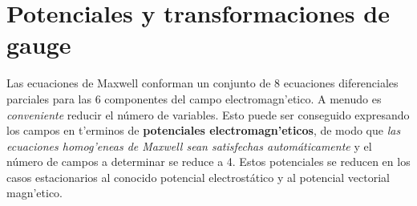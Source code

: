 \section{Potenciales y transformaciones de gauge}

Las ecuaciones de Maxwell conforman un conjunto de 8 ecuaciones diferenciales
parciales para las 6 componentes del campo electromagn'etico. A menudo es
\textit{conveniente} reducir el número de variables. Esto puede ser conseguido
expresando los campos en t'erminos de \textbf{potenciales electromagn'eticos},
de modo que \textit{las ecuaciones homog'eneas de Maxwell sean satisfechas
automáticamente} y el número de campos a determinar se reduce a 4. Estos
potenciales se reducen en los casos estacionarios al conocido potencial
electrostático y al potencial vectorial magn'etico.

